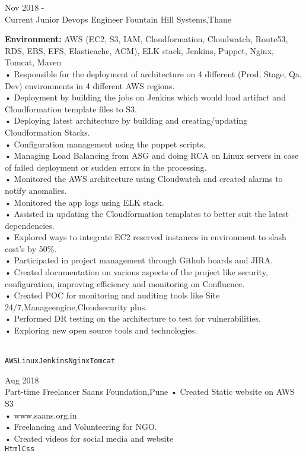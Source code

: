 \documentclass[9pt]{developercv} %
\begin{document}

\begin{entrylist}
	\entry
		{Nov 2018 -\\Current}
		{Junior Devops Engineer}
		{Fountain Hill Systems,Thane}
		{\textbf{Environment:} AWS (EC2, S3, IAM, Cloudformation, Cloudwatch, Route53, RDS, EBS, EFS, Elasticache, ACM), ELK stack, Jenkins, Puppet, Nginx, Tomcat, Maven\\
		• Responsible for the deployment of architecture on 4 different (Prod, Stage, Qa, Dev) environments in 4 different AWS regions.\\
		• Deployment by building the jobs on Jenkins which would load artifact and Cloudformation template files to S3.\\
		• Deploying latest architecture by building and creating/updating Cloudformation Stacks.\\
		• Configuration management using the puppet scripts.\\
		• Managing Load Balancing from ASG and doing RCA on Linux servers in case of failed deployment or sudden errors in the processing.\\
		• Monitored the AWS architecture using Cloudwatch and created alarms to notify anomalies.\\
		• Monitored the app logs using ELK stack.\\
 • Assisted in updating the Cloudformation templates to better suit the latest dependencies.\\
 • Explored ways to integrate EC2 reserved instances in environment to slash cost's by 50\%.  \\
 • Participated in project management through Github boards and JIRA.\\
 • Created documentation on various aspects of the project like security, configuration, improving efficiency and monitoring on Confluence.\\
  • Created POC for monitoring and auditing tools like Site 24/7,Manageengine,Cloudsecurity plus.\\
• Performed DR testing on the architecture to test for vulnerabilities. \\
• Exploring new open source tools and technologies.
 

\\ \texttt{AWS}\slashsep\texttt{Linux}\slashsep\texttt{Jenkins}\slashsep\texttt{Nginx}\slashsep\texttt{Tomcat}}
	\entry
		{Aug 2018\\\footnotesize{Part-time}}
		{Freelancer}
		{Saans Foundation,Pune}
		{• Created Static website on AWS S3\\ • www.saans.org.in \\ 
	    • Freelancing and Volunteering for NGO. \\
	   • Created videos for social media and website\\\texttt{Html}\slashsep\texttt{Css}}
		

\end{entrylist}
\end{document}
